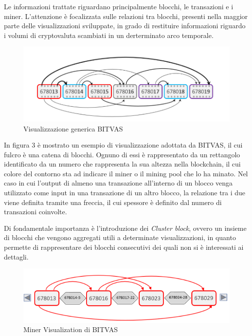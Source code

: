 Le informazioni trattate riguardano principalmente blocchi, le transazioni e i miner.
L'attenzione è focalizzata sulle relazioni tra blocchi, presenti nella maggior parte delle visualizzazioni sviluppate, in grado di restituire informazioni riguardo i volumi di cryptovaluta scambiati in un derterminato arco temporale.
\newpage
\thispagestyle{mystyle}
\begin{figure}[H]
    \centering \includegraphics[keepaspectratio=true,scale=0.5]{Images/exampleBitvasVis.png}
    \caption{Visualizzazione generica BITVAS}
\end{figure}

In figura 3 è mostrato un esempio di visualizzazione adottata da BITVAS, il cui fulcro è una catena di blocchi.
Ognuno di essi è rappresentato da un rettangolo identificato da un numero che rappresenta la sua altezza nella blockchain, il cui colore del contorno sta ad indicare il miner o il mining pool che lo ha minato.
Nel caso in cui l'output di almeno una transazione all'interno di un blocco venga utilizzato come input in una transazione di un altro blocco, la relazione tra i due viene definita tramite una freccia, il cui spessore è definito dal numero di transazioni coinvolte.

Di fondamentale importanza è l'introduzione dei \emph{Cluster block}, ovvero un insieme di blocchi che vengono aggregati utili a determinate visualizzazioni, in quanto permette di rappresentare dei blocchi consecutivi dei quali non si è interessati ai dettagli.



\begin{figure}[H]
    \centering \includegraphics[keepaspectratio=true,scale=0.7]{Images/MinerVisualization2.png}
    \caption{Miner Visualization di  BITVAS}
\end{figure}


